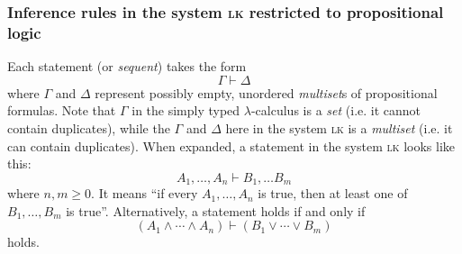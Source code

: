 \subsubsection{Inference rules in the system \textsc{lk} restricted to propositional logic}
Each statement (or \textit{sequent}) takes the form
\[
    \Gamma \vdash \Delta
\]
where $\Gamma$ and $\Delta$ represent possibly empty, unordered \textit{multiset}s of propositional formulas. Note that $\Gamma$ in the simply typed $\lambda$-calculus is a \textit{set} (i.e. it cannot contain duplicates), while the $\Gamma$ and $\Delta$ here in the system \textsc{lk} is a \textit{multiset} (i.e. it can contain duplicates). When expanded, a statement in the system \textsc{lk} looks like this:
\[
    A_1, \ldots, A_n \vdash B_1, \ldots B_m
\]
where $n, m \geq 0$. It means ``if every $A_1, \ldots, A_n$ is true, then at least one of $B_1, \ldots, B_m$ is true''. Alternatively, a statement holds if and only if
\[
    (A_1 \land \cdots \land A_n) \vdash (B_1 \lor \cdots \lor B_m)
\]
holds.

